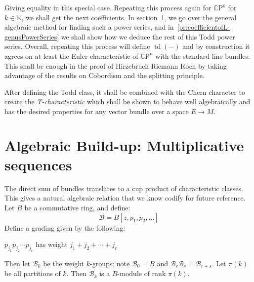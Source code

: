 \documentclass{book}
\newcommand{\N}{{\mathbb{N}}}
\newcommand{\Z}{{\mathbb{Z}}}
\newcommand{\CB}{{\mathcal{B}}}
\newcommand{\cp}{{\mathpzc{p}}}
\newcommand{\CP}{{\mathbb{C}\mathrm{P}}}
\newcommand{\td}{{\operatorname{td}}}
\begin{document}
Giving equality in this special case. Repeating this process again for $\CP^k$ for $k \in \N$, we shall get
the next coefficients. In section~\ref{sec:mSequence}, we go over the general algebraic method for finding
such a power series, and in~\cref{pr:coefficientofL-genusPowerSeries} we shall show how we deduce the rest of
this Todd power series. Overall, repeating this process will define $\td(-)$ and by construction it agrees on
at least the Euler characteristic of $\CP^n$ with the standard line bundles. This shall be enough in the
proof of Hirzebruch Riemann Roch by taking advantage of the results on Cobordism and the splitting principle.

After defining the Todd class, it shall be combined with the Chern character to create the
\emph{T-characteristic} which shall be shown to behave well algebraically and has the desired properties for
any vector bundle over a space $E \to M$.


%

\section{Algebraic Build-up: Multiplicative sequences}\label{sec:mSequence}

The direct sum of bundles translates to a cup product of
characteristic classes. This gives a natural algebraic relation that we know codify for future reference. Let
$B$ be a commutative ring, and define:
\[
  \CB = B[z, p_1, p_2, ...]
\]
Define a grading given by the following:
\begin{center}
  $p_{j_1}p_{j_2}\cdots p_{j_r}$ has weight $j_1 + j_2 + \cdots + j_r$
\end{center}
Then let $\CB_k$ be the weight $k$-groups; note $\CB_0 = B$ and $\CB_r\CB_s = \CB_{r+s}$. Let $\pi(k)$ be all
partitions of $k$. Then $\CB_k$ is a $B$-module of rank $\pi(k)$.
\end{document}
